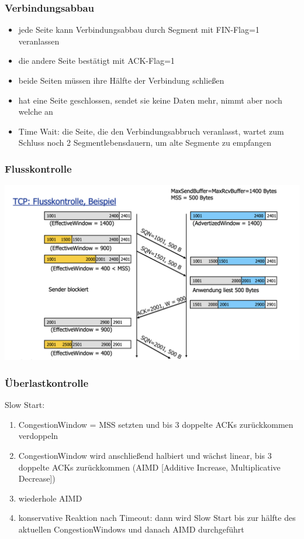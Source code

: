 \subsubsection{Verbindungsabbau}
\begin{itemize}
	\item jede Seite kann Verbindungsabbau durch Segment mit FIN-Flag=1 veranlassen
	\item die andere Seite bestätigt mit ACK-Flag=1
	\item beide Seiten müssen ihre Hälfte der Verbindung schließen
	\item hat eine Seite geschlossen, sendet sie keine Daten mehr, nimmt aber noch welche an
	\item Time Wait: die Seite, die den Verbindungsabbruch veranlasst, wartet zum Schluss noch 2 Segmentlebensdauern, um alte Segmente zu empfangen 
\end{itemize}
\subsubsection{Flusskontrolle}
\begin{center}
	\includegraphics[scale=0.25]{images/TCP_Flusskontrolle.png}
\end{center}
\subsubsection{Überlastkontrolle}
Slow Start:
\begin{enumerate}
	\item CongestionWindow = MSS setzten und bis 3 doppelte ACKs zurückkommen verdoppeln
	\item CongestionWindow wird anschließend halbiert und wächst linear, bis 3 doppelte ACKs zurückkommen (AIMD [Additive Increase, Multiplicative Decrease])
	\item wiederhole AIMD
	\item konservative Reaktion nach Timeout: dann wird Slow Start bis zur hälfte des aktuellen CongestionWindows und danach AIMD durchgeführt
\end{enumerate}





